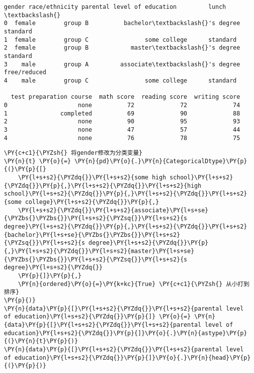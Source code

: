             \begin{tcolorbox}[breakable, size=fbox, boxrule=.5pt, pad at break*=1mm, opacityfill=0]
\begin{Verbatim}[commandchars=\\\{\}]
   gender race/ethnicity parental level of education         lunch  \textbackslash{}
0  female        group B          bachelor\textbackslash{}'s degree      standard
1  female        group C                some college      standard
2  female        group B            master\textbackslash{}'s degree      standard
3    male        group A         associate\textbackslash{}'s degree  free/reduced
4    male        group C                some college      standard

  test preparation course  math score  reading score  writing score
0                    none          72             72             74
1               completed          69             90             88
2                    none          90             95             93
3                    none          47             57             44
4                    none          76             78             75
\end{Verbatim}
\end{tcolorbox}
        
    \begin{tcolorbox}[breakable, size=fbox, boxrule=1pt, pad at break*=1mm,colback=cellbackground, colframe=cellborder]
\begin{Verbatim}[commandchars=\\\{\}]
\PY{c+c1}{\PYZsh{} 将gender修改为分类变量}
\PY{n}{t} \PY{o}{=} \PY{n}{pd}\PY{o}{.}\PY{n}{CategoricalDtype}\PY{p}{(}\PY{p}{[}
    \PY{l+s+s2}{\PYZdq{}}\PY{l+s+s2}{some high school}\PY{l+s+s2}{\PYZdq{}}\PY{p}{,}\PY{l+s+s2}{\PYZdq{}}\PY{l+s+s2}{high school}\PY{l+s+s2}{\PYZdq{}}\PY{p}{,}\PY{l+s+s2}{\PYZdq{}}\PY{l+s+s2}{some college}\PY{l+s+s2}{\PYZdq{}}\PY{p}{,}
    \PY{l+s+s2}{\PYZdq{}}\PY{l+s+s2}{associate}\PY{l+s+se}{\PYZbs{}\PYZbs{}}\PY{l+s+s2}{\PYZsq{}}\PY{l+s+s2}{s degree}\PY{l+s+s2}{\PYZdq{}}\PY{p}{,}\PY{l+s+s2}{\PYZdq{}}\PY{l+s+s2}{bachelor}\PY{l+s+se}{\PYZbs{}\PYZbs{}}\PY{l+s+s2}{\PYZsq{}}\PY{l+s+s2}{s degree}\PY{l+s+s2}{\PYZdq{}}\PY{p}{,}\PY{l+s+s2}{\PYZdq{}}\PY{l+s+s2}{master}\PY{l+s+se}{\PYZbs{}\PYZbs{}}\PY{l+s+s2}{\PYZsq{}}\PY{l+s+s2}{s degree}\PY{l+s+s2}{\PYZdq{}}
    \PY{p}{]}\PY{p}{,}
    \PY{n}{ordered}\PY{o}{=}\PY{k+kc}{True} \PY{c+c1}{\PYZsh{} 从小打到排序}
\PY{p}{)}
\PY{n}{data}\PY{p}{[}\PY{l+s+s2}{\PYZdq{}}\PY{l+s+s2}{parental level of education}\PY{l+s+s2}{\PYZdq{}}\PY{p}{]} \PY{o}{=} \PY{n}{data}\PY{p}{[}\PY{l+s+s2}{\PYZdq{}}\PY{l+s+s2}{parental level of education}\PY{l+s+s2}{\PYZdq{}}\PY{p}{]}\PY{o}{.}\PY{n}{astype}\PY{p}{(}\PY{n}{t}\PY{p}{)}
\PY{n}{data}\PY{p}{[}\PY{l+s+s2}{\PYZdq{}}\PY{l+s+s2}{parental level of education}\PY{l+s+s2}{\PYZdq{}}\PY{p}{]}\PY{o}{.}\PY{n}{head}\PY{p}{(}\PY{p}{)}
\end{Verbatim}
\end{tcolorbox}

